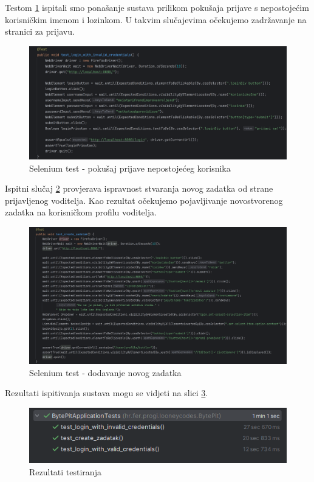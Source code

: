 Testom \ref{fig:selenium2} ispitali smo ponašanje sustava prilikom pokušaja prijave s nepostojećim korisničkim imenom i lozinkom. U takvim slučajevima očekujemo zadržavanje na stranici za prijavu.

\begin{figure}[H]
	\includegraphics[scale=0.16]{slike/selenium_test2.png}
	\centering
	\caption{Selenium test - pokušaj prijave nepostojećeg korisnika}
	\label{fig:selenium2}
\end{figure}
\pagebreak
Ispitni slučaj \ref{fig:selenium3} provjerava ispravnost stvaranja novog zadatka od strane prijavljenog voditelja. Kao rezultat očekujemo pojavljivanje novostvorenog zadatka na korisničkom profilu voditelja.

\begin{figure}[H]
	\includegraphics[scale=0.14]{slike/selenium_test3.png}
	\centering
	\caption{Selenium test - dodavanje novog zadatka}
	\label{fig:selenium3}
\end{figure}

\noindent Rezultati ispitivanja sustava mogu se vidjeti na slici \ref{fig:selenium_rezultati}.

\begin{figure}[H]
	\includegraphics[scale=0.8]{slike/selenium_reultati.png}
	\centering
	\caption{Rezultati testiranja}
	\label{fig:selenium_rezultati}
\end{figure}


